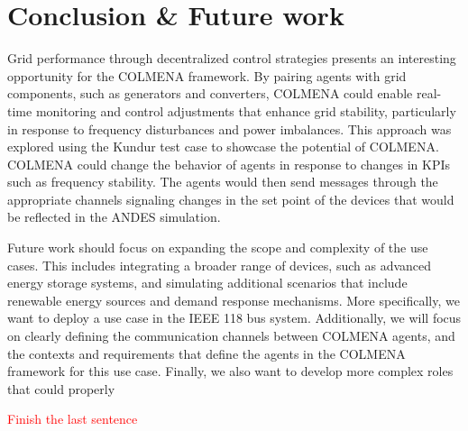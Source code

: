 \documentclass{article}
\begin{document}
\section{Conclusion \& Future work}

Grid performance through decentralized control strategies presents an interesting opportunity for the COLMENA framework. By pairing agents with grid components, such as generators and converters, COLMENA could enable real-time monitoring and control adjustments that enhance grid stability, particularly in response to frequency disturbances and power imbalances. This approach was explored using the Kundur test case to showcase the potential of COLMENA. COLMENA could change the behavior of agents in response to changes in KPIs such as frequency stability. The agents would then send messages through the appropriate channels signaling changes in the set point of the devices that would be reflected in the ANDES simulation.

Future work should focus on expanding the scope and complexity of the use cases. This includes integrating a broader range of devices, such as advanced energy storage systems, and simulating additional scenarios that include renewable energy sources and demand response mechanisms. More specifically, we want to deploy a use case in the IEEE 118 bus system. Additionally, we will focus on clearly defining the communication channels between COLMENA agents, and the contexts  and requirements that define the agents in the COLMENA framework for this use case. Finally, we also want to develop more complex roles that could properly   

\textcolor{red}{Finish the last sentence}

\end{document}
